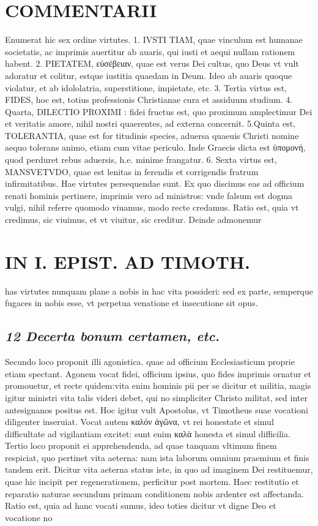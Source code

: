 \documentclass{article}
\begin{document}
\begin{pages}
\section*{COMMENTARII }
\marginpar{[ p.160 ]}\pstart Enumerat hic sex ordine virtutes. 1. IVSTI TIAM, quae vinculum est humanae societatis, ac imprimis auertitur ab auaris, qui iusti et aequi nullam rationem habent. 2. PIETATEM, εὐσέβειαν, quae est verus Dei cultus, quo Deus vt vult adoratur et colitur, estque iustitia quaedam in Deum. Ideo ab auaris quoque violatur, et ab idololatria, superstitione, impietate, etc. 3. Tertia virtus est, FIDES, hoc est, totius professionis Christianae cura et assiduum studium. 4. Quarta, DILECTIO PROXIMI : fidei fructus est, quo proximum amplectimur Dei et veritatis amore, nihil nostri quaerentes, ad externa concernit. 5.Quinta est, TOLERANTIA, quae est for titudinis species, aduersa quaeuis Christi nomine aequo tolerans animo, etiam cum vitae periculo. Inde Graecis dicta est ὑπομονή, quod perduret rebus  aduersis, h.e. minime frangatur. 6. Sexta virtus est, MANSVETVDO, quae est lenitas in ferendis et corrigendis fratrum infirmitatibus. Hae virtutes persequendae sunt. Ex quo discimus eas ad officium renati hominis pertinere, imprimis vero ad ministros: vnde falsum est dogma vulgi, nihil referre quomodo viuamus, modo recte credamus.  \pend\pstart Ratio est, quia vt credimus, sic viuimus, et vt viuitur, sic creditur. Deinde admonemur  \pend
\section*{IN I. EPIST. AD TIMOTH. }
\marginpar{[ p.161 ]}\pstart has virtutes nunquam plane a nobis in hac vita possideri: sed ex parte, semperque fugaces in nobis esse, vt perpetua venatione et insecutione sit opus.  \pend
{}
{}
\subsection*{\textit{12 Decerta bonum certamen, etc. }}\pstart Secundo loco proponit illi agonistica. quae ad officium Ecclesiasticum proprie etiam spectant. Agonem vocat fidei, officium ipsius, quo fides imprimis ornatur et promouetur, et recte quidem:vita enim hominis pii per se dicitur et militia, magis igitur ministri vita talis videri debet, qui no simpliciter Christo militat, sed inter antesignanos positus est. Hoc igitur vult Apostolus, vt Timotheus suae vocationi diligenter inseruiat. Vocat autem καλόν ἀγῶνα, vt rei honestate et simul difficultate ad vigilantiam excitet: sunt enim καλὰ honesta et simul difficilia.  \pend\pstart Tertio loco proponit ei apprehendenda, ad quae tanquam vltimum finem respiciat, quo pertinet vita aeterna: nam ista laborum omnium praemium et finis tandem erit. Dicitur vita aeterna status iste, in quo ad imaginem Dei restituemur, quae hic incipit per regenerationem, perficitur post mortem. Haec restitutio et reparatio naturae secundum primam conditionem nobis ardenter est affectanda. Ratio est, quia ad hanc vocati sumus, ideo toties dicitur vt digne Deo et vocatione no\pend

\end{pages}
\end{document}
